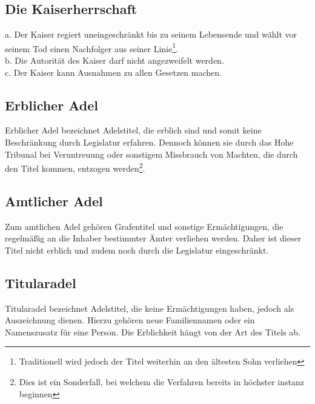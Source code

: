 \documentclass{article}
\begin{document}
\subsection{Die Kaiserherrschaft}
a. Der Kaiser regiert uneingeschränkt bis zu seinem Lebensende und wählt vor seinem Tod einen Nachfolger aus seiner Linie\footnote{Traditionell wird jedoch der Titel weiterhin an den ältesten Sohn verliehen}.  \\
b. Die Autorität des Kaiser darf nicht angezweifelt werden.  \\
c. Der Kaiser kann Ausnahmen zu allen Gesetzen machen.  \\

\subsection{Erblicher Adel}
Erblicher Adel bezeichnet Adelstitel, die erblich sind und somit keine Beschränkung durch Legislatur erfahren. Dennoch können sie durch das Hohe Tribunal bei Veruntreuung oder sonstigem Missbrauch von Machten, die durch den Titel kommen, entzogen werden\footnote{Dies ist ein Sonderfall, bei welchem die Verfahren bereits in höchster instanz beginnen}.  

\subsection{Amtlicher Adel}
Zum amtlichen Adel gehören Grafentitel und sonstige Ermächtigungen, die regelmäßig an die Inhaber bestimmter Ämter verliehen werden. Daher ist dieser Titel nicht erblich und zudem noch durch die Legislatur eingeschränkt.  

\subsection{Titularadel}
Titularadel bezeichnet Adelstitel, die keine Ermächtigungen haben, jedoch als Auszeichnung dienen. Hierzu gehören neue Familiennamen oder ein Namenszusatz für eine Person. Die Erblichkeit hängt von der Art des Titels ab.  
\end{document}
